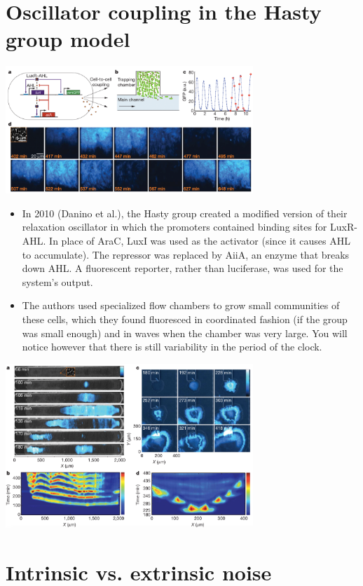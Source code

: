 \documentclass{article}
\begin{document}
\section*{Oscillator coupling in the Hasty group model}
\begin{center}
\includegraphics[width=0.7\textwidth]{danino_small.png}
\end{center}
\begin{itemize}
\item In 2010 (Danino et al.), the Hasty group created a modified version of their relaxation oscillator in which the promoters contained binding sites for LuxR-AHL. In place of AraC, LuxI was used as the activator (since it causes AHL to accumulate). The repressor was replaced by AiiA, an enzyme that breaks down AHL.  A fluorescent reporter, rather than luciferase, was used for the system's output.
\item The authors used specialized flow chambers to grow small communities of these cells, which they found fluoresced in coordinated fashion (if the group was small enough) and in waves when the chamber was very large. You will notice however that there is still variability in the period of the clock.
\end{itemize}
\begin{center}
\includegraphics[width=0.7\textwidth]{danino_large.png}
\end{center}

\section*{Intrinsic vs. extrinsic noise}
\end{document}
